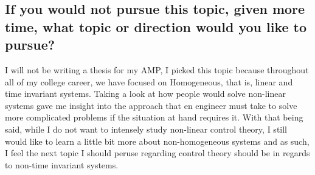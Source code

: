 \documentclass{IEEEtran}
\begin{document}
\subsection{If you would not pursue this topic, given more time, what topic or direction would you like to pursue?}
I will not be writing a thesis for my AMP, I picked this topic because throughout all of my college career, we have focused on Homogeneous, that is, linear and time invariant systems. Taking a look at how people would solve non-linear systems gave me insight into the approach that en engineer must take to solve more complicated problems if the situation at hand requires it. With that being said, while I do not want to intensely study non-linear control theory, I still would like to learn a little bit more about non-homogeneous systems and as such, I feel the next topic I should peruse regarding control theory should be in regards to non-time invariant systems.






\end{document}
